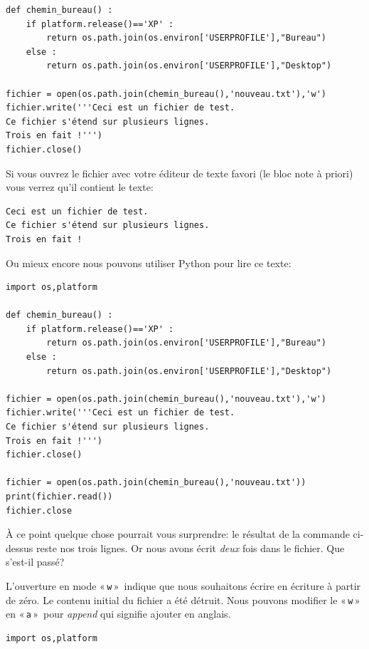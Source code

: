 \begin{MAC}
\begin{Verbatim}[frame=single,rulecolor=\color{mbleu}, label=à taper par exemple en reprenant l'existant]
def chemin_bureau() :
    if platform.release()=='XP' :
        return os.path.join(os.environ['USERPROFILE'],"Bureau")
    else :
        return os.path.join(os.environ['USERPROFILE'],"Desktop")
    
fichier = open(os.path.join(chemin_bureau(),'nouveau.txt'),'w')
fichier.write('''Ceci est un fichier de test.
Ce fichier s'étend sur plusieurs lignes.
Trois en fait !''')
fichier.close()
\end{Verbatim}

Si vous ouvrez le fichier avec votre éditeur de texte favori (le bloc note à priori) vous verrez qu'il contient le texte:

\begin{Verbatim}[frame=single,rulecolor=\color{gray}, label=contenu de nouveau.txt]
Ceci est un fichier de test.
Ce fichier s'étend sur plusieurs lignes.
Trois en fait !
\end{Verbatim}

Ou mieux encore nous pouvons utiliser Python pour lire ce texte:

\begin{Verbatim}[frame=single,rulecolor=\color{mbleu}, label=à taper par exemple en reprenant l'existant]
import os,platform

def chemin_bureau() :
    if platform.release()=='XP' :
        return os.path.join(os.environ['USERPROFILE'],"Bureau")
    else :
        return os.path.join(os.environ['USERPROFILE'],"Desktop")
    
fichier = open(os.path.join(chemin_bureau(),'nouveau.txt'),'w')
fichier.write('''Ceci est un fichier de test.
Ce fichier s'étend sur plusieurs lignes.
Trois en fait !''')
fichier.close()

fichier = open(os.path.join(chemin_bureau(),'nouveau.txt'))
print(fichier.read())
fichier.close
\end{Verbatim}

À ce point quelque chose pourrait vous surprendre: le résultat de la commande ci-dessus reste nos trois lignes. Or nous avons écrit \emph{deux} fois dans le fichier. Que s'est-il passé?

L'ouverture en mode « \texttt{w} »  indique que nous souhaitons écrire en écriture à partir de zéro. Le contenu initial du fichier a été détruit. Nous pouvons modifier le « \texttt{w} »  en « \texttt{a} »  pour \emph{append} qui signifie ajouter en anglais.

\begin{Verbatim}[frame=single,rulecolor=\color{mbleu}, label=à taper par exemple en reprenant l'existant]
import os,platform


\end{Verbatim}
\end{MAC}
